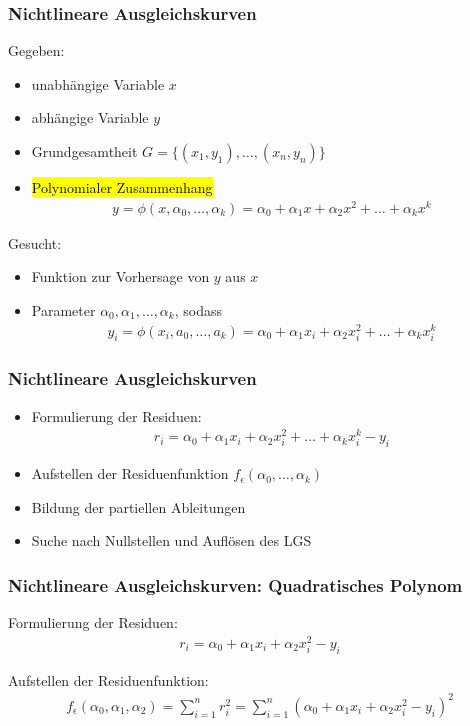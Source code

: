 \begin{frame}
\frametitle{Nichtlineare Ausgleichskurven}

Gegeben:
\begin{itemize}
	\item unabhängige Variable $x$
	\item abhängige Variable $y$
	\item Grundgesamtheit $G = \{(x_1, y_1), \dots, (x_n, y_n)\}$
	\item \hl{Polynomialer Zusammenhang} \begin{align*}
		y = \phi(x, \alpha_0, \dots, \alpha_k) = \alpha_0 + \alpha_1 x + \alpha_2 x^2 + \dots + \alpha_k x^k
	\end{align*}
\end{itemize}

Gesucht:
\begin{itemize}
	\item Funktion zur Vorhersage von $y$ aus $x$
	\item Parameter $\alpha_0, \alpha_1, \dots, \alpha_k$, sodass \begin{align*}
		y_i = \phi(x_i, a_0, \dots, a_k) = \alpha_0 + \alpha_1 x_i + \alpha_2 x_i^2 + \dots + \alpha_k x_i^k
	\end{align*}
\end{itemize}

\end{frame}


\begin{frame}
\frametitle{Nichtlineare Ausgleichskurven}

\begin{itemize}
	\item Formulierung der Residuen: \begin{align*}
		r_i = \alpha_0 + \alpha_1 x_i + \alpha_2 x_i^2 + \dots + \alpha_k x^k_i - y_i
	\end{align*}
	\item Aufstellen der Residuenfunktion $f_\epsilon(\alpha_0, \dots, \alpha_k)$
	\item Bildung der partiellen Ableitungen
	\item Suche nach Nullstellen und Auflösen des LGS
\end{itemize}

\end{frame}


\begin{frame}
\frametitle{Nichtlineare Ausgleichskurven: Quadratisches Polynom}

Formulierung der Residuen: \begin{align*}
	r_i = \alpha_0 + \alpha_1 x_i + \alpha_2 x_i^2 - y_i
\end{align*}

Aufstellen der Residuenfunktion: \begin{align*}
	f_\epsilon(\alpha_0, \alpha_1, \alpha_2) = \sum_{i=1}^{n} r_i^2 = \sum_{i=1}^{n} (\alpha_0 + \alpha_1 x_i + \alpha_2 x_i^2 - y_i)^2
\end{align*}

\end{frame}

